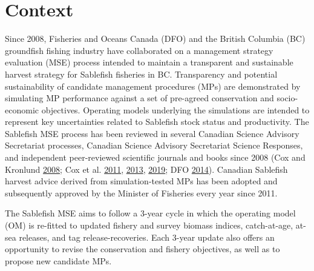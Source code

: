 \documentclass[11pt]{book}
\begin{document}
\MakeFirstPage

\hypertarget{context}{%
\section{Context}\label{context}}

Since 2008, Fisheries and Oceans Canada (DFO) and the British Columbia (BC) groundfish fishing industry have collaborated on a management strategy evaluation (MSE) process intended to maintain a transparent and sustainable harvest strategy for Sablefish fisheries in BC. Transparency and potential sustainability of candidate management procedures (MPs) are demonstrated by simulating MP performance against a set of pre-agreed conservation and socio-economic objectives. Operating models underlying the simulations are intended to represent key uncertainties related to Sablefish stock status and productivity. The Sablefish MSE process has been reviewed in several Canadian Science Advisory Secretariat processes, Canadian Science Advisory Secretariat Science Responses, and independent peer-reviewed scientific journals and books since 2008 (Cox and Kronlund \protect\hyperlink{ref-cox2008practical}{2008}; Cox et al. \protect\hyperlink{ref-cox2011management}{2011}, \protect\hyperlink{ref-cox2013roles}{2013}, \protect\hyperlink{ref-cox2019evaluating}{2019}; DFO \protect\hyperlink{ref-dfo2014performanc}{2014}). Canadian Sablefish harvest advice derived from simulation-tested MPs has been adopted and subsequently approved by the Minister of Fisheries every year since 2011.

The Sablefish MSE aims to follow a 3-year cycle in which the operating model (OM) is re-fitted to updated fishery and survey biomass indices, catch-at-age, at-sea releases, and tag release-recoveries. Each 3-year update also offers an opportunity to revise the conservation and fishery objectives, as well as to propose new candidate MPs.
\end{document}
